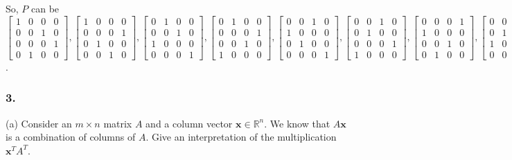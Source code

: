 So, $P$ can be $\begin{bmatrix}
    1&0&0&0\\0&0&1&0\\0&0&0&1\\0&1&0&0
\end{bmatrix}, \begin{bmatrix}
    1&0&0&0\\0&0&0&1\\0&1&0&0\\0&0&1&0
\end{bmatrix}, \begin{bmatrix}
    0&1&0&0\\0&0&1&0\\1&0&0&0\\0&0&0&1
\end{bmatrix}, \begin{bmatrix}
    0&1&0&0\\0&0&0&1\\0&0&1&0\\1&0&0&0
\end{bmatrix}, \begin{bmatrix}
    0&0&1&0\\1&0&0&0\\0&1&0&0\\0&0&0&1
\end{bmatrix}, \begin{bmatrix}
    0&0&1&0\\0&1&0&0\\0&0&0&1\\1&0&0&0
\end{bmatrix}, \begin{bmatrix}
    0&0&0&1\\1&0&0&0\\0&0&1&0\\0&1&0&0
\end{bmatrix}, \begin{bmatrix}
    0&0&0&1\\0&1&0&0\\1&0&0&0\\0&0&1&0
\end{bmatrix}$.
\newpage
\subsubsection{3.}
(a) Consider an $m\times n$ matrix $A$ and a column vector $\mathbf{x} \in \mathbb{R}^n$.
We know that $A\mathbf{x}$ is a combination of columns of $A$. Give an interpretation of the multiplication $\mathbf{x}^T A^T$.
